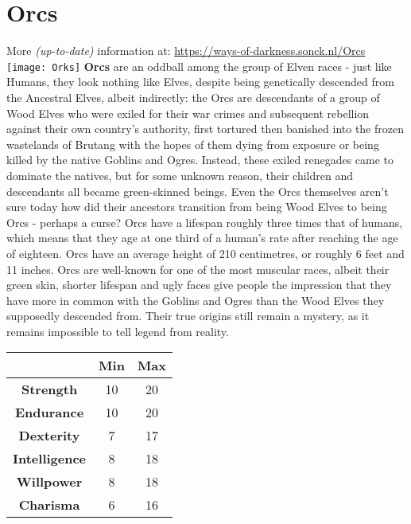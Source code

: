 \documentclass[openany,10pt,a4paper]{book}
\begin{document}
\section{Orcs}
More \textit{(up-to-date)} information at: \url{https://ways-of-darkness.sonck.nl/Orcs}\newline
\texttt{[image: Orks]}\newline
\textbf{Orcs} are an oddball among the group of Elven races - just like Humans, they look nothing like Elves, despite being genetically descended from the Ancestral Elves, albeit indirectly: the Orcs are descendants of a group of Wood Elves who were exiled for their war crimes and subsequent rebellion against their own country's authority, first tortured then banished into the frozen wastelands of Brutang with the hopes of them dying from exposure or being killed by the native Goblins and Ogres. Instead, these exiled renegades came to dominate the natives, but for some unknown reason, their children and descendants all became green-skinned beings. Even the Orcs themselves aren't sure today how did their ancestors transition from being Wood Elves to being Orcs - perhaps a curse?\newline
Orcs have a lifespan roughly three times that of humans, which means that they age at one third of a human's rate after reaching the age of eighteen. Orcs have an average height of 210 centimetres, or roughly 6 feet and 11 inches. Orcs are well-known for one of the most muscular races, albeit their green skin, shorter lifespan and ugly faces give people the impression that they have more in common with the Goblins and Ogres than the Wood Elves they supposedly descended from. Their true origins still remain a mystery, as it remains impossible to tell legend from reality.\newline
\begin{tabular}{|c|c|c|}
\hline
 & \textbf{Min} & \textbf{Max} \\ \hline
\textbf{Strength} & 10 & 20 \\ \hline
\textbf{Endurance} & 10 & 20 \\ \hline
\textbf{Dexterity} & 7 & 17 \\ \hline
\textbf{Intelligence} & 8 & 18 \\ \hline
\textbf{Willpower} & 8 & 18 \\ \hline
\textbf{Charisma} & 6 & 16 \\ \hline
\end{tabular}\newline
{}\newpage
\end{document}
